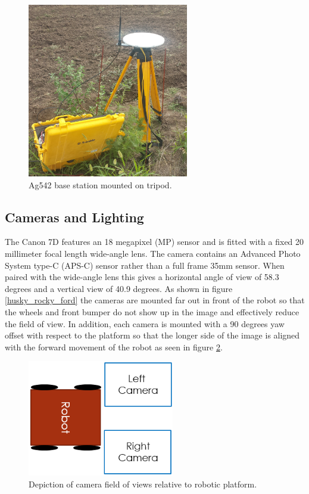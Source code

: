 \begin{figure}[htb]
	\centering
    \includegraphics[height=3in]{figures/sunflower_base_cropped.jpg}
    \caption[Base station with tripod]{Ag542 base station mounted on tripod.}
    \label{base_station}
\end{figure}

\subsection{Cameras and Lighting}

The Canon 7D features an 18 megapixel (MP) sensor and is fitted with a fixed 20 millimeter focal length wide-angle lens.  The camera contains an Advanced Photo System type-C (APS-C) sensor rather than a full frame 35mm sensor. When paired with the wide-angle lens this gives a horizontal angle of view of 58.3 degrees and a vertical view of 40.9 degrees.  
As shown in figure \ref{husky_rocky_ford} the cameras are mounted far out in front of the robot so that the wheels and front bumper do not show up in the image and effectively reduce the field of view.  In addition, each camera is mounted with a 90 degrees yaw offset with respect to the platform so that the longer side of the image is aligned with the forward movement of the robot as seen in figure \ref{figure:image_fov}.  

\begin{figure}[htb]
	\centering
    \includegraphics[height=2in]{figures/camera_directions.png}
    \caption[Camera field of view]{Depiction of camera field of views relative to robotic platform.}
    \label{figure:image_fov}
\end{figure}


